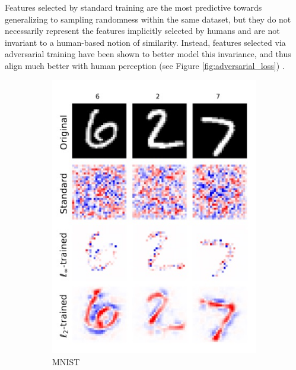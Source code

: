 Features selected by standard training
are the most predictive towards generalizing
to sampling randomness within the same dataset, but they do
not necessarily represent the features implicitly selected 
by humans and are not invariant to a human-based notion 
of similarity. Instead, features selected via adversarial training 
have been shown to better model this
invariance, and thus align much better with 
human perception (see Figure \ref{fig:adversarial_loss})
\cite{ilyasAdversarialExamplesAre2019}. 

\begin{figure}[H]
    \centering
    \begin{subfigure}[b]{0.35\textwidth}
        \centering
        \includegraphics[width=\textwidth]{img/introduction/adversarial_loss_1.jpg}
        \caption{MNIST}
    \end{subfigure}
    \hspace{1cm}
    \begin{subfigure}[b]{0.35\textwidth}

\end{subfigure}
\end{figure}
